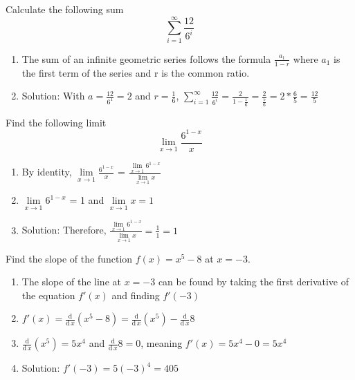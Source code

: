 \documentclass[10pt]{article}
\newenvironment{problem}[2][Problem]{\begin{trivlist}
\item[\hskip \labelsep {\bfseries #1}\hskip \labelsep {\bfseries #2.}]}{\end{trivlist}}
\begin{document}
\begin{problem}{3.1}
Calculate the following sum
$$\sum\limits_{i=1}^{\infty} \frac{12}{6^i}$$

\begin{enumerate}
    \item The sum of an infinite geometric series follows the formula $\frac{a_1}{1-r}$ where $a_1$ is the first term of the series and r is the common ratio.
    \item Solution: With $a = \frac{12}{6^1} = 2$ and $r = \frac{1}{6}$, $\sum\limits_{i=1}^{\infty} \frac{12}{6^i} = \frac{2}{1 - \frac{1}{6}} = \frac{2}{\frac{5}{6}} = 2*\frac{6}{5} = \frac{12}{5}$
\end{enumerate}
\end{problem}

\begin{problem}{3.2}
Find the following limit
$$\lim\limits_{x \rightarrow 1}\frac{6^{1-x}}{x}$$

\begin{enumerate}
    \item By identity, $\lim\limits_{x \rightarrow 1}\frac{6^{1-x}}{x}$ = $\frac{\lim\limits_{x \rightarrow 1}6^{1-x}}{\lim\limits_{x \rightarrow 1}x}$
    \item $\lim\limits_{x \rightarrow 1}6^{1-x}$ = 1 and $\lim\limits_{x \rightarrow 1}x = 1$
    \item Solution: Therefore, $\frac{\lim\limits_{x \rightarrow 1}6^{1-x}}{\lim\limits_{x \rightarrow 1}x} = \frac{1}{1} = 1$
\end{enumerate}
\end{problem}

\begin{problem}{3.3}
Find the slope of the function $f(x)=x^5-8$ at $x=-3$.

\begin{enumerate}
    \item The slope of the line at $x=-3$ can be found by taking the first derivative of the equation $f'(x)$ and finding $f'(-3)$
    \item $f'(x) = \frac{\mathrm{d}}{\mathrm{d}\, x}(x^5 - 8) = \frac{\mathrm{d}}{\mathrm{d}\, x}(x^5) - \frac{\mathrm{d}}{\mathrm{d}\, x}8$
    \item $\frac{\mathrm{d}}{\mathrm{d}\, x}(x^5) = 5x^4$ and $\frac{\mathrm{d}}{\mathrm{d}\, x}8 = 0$, meaning $f'(x) = 5x^4 - 0 = 5x^4$
    \item Solution: $f'(-3) = 5(-3)^4 = 405$
\end{enumerate}
\end{problem}
\end{document}
